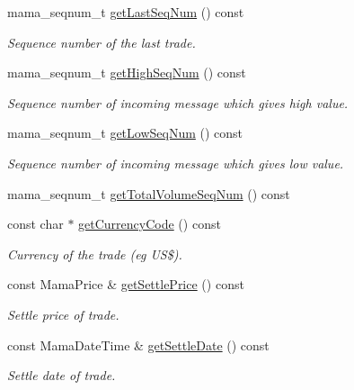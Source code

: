 \begin{CompactItemize}
mama\_\-seqnum\_\-t \hyperlink{classWombat_1_1MamdaTradeListener_bac3ca4094b86f6dd797e68417f04c15}{get\-Last\-Seq\-Num} () const 
\begin{CompactList}\small\item\em Sequence number of the last trade. \item\end{CompactList}\item 
mama\_\-seqnum\_\-t \hyperlink{classWombat_1_1MamdaTradeListener_cfa0551c486d97d5cb04e17f2d2483d4}{get\-High\-Seq\-Num} () const 
\begin{CompactList}\small\item\em Sequence number of incoming message which gives high value. \item\end{CompactList}\item 
mama\_\-seqnum\_\-t \hyperlink{classWombat_1_1MamdaTradeListener_5b4c5e492cb7d005e416e21c7ef819f2}{get\-Low\-Seq\-Num} () const 
\begin{CompactList}\small\item\em Sequence number of incoming message which gives low value. \item\end{CompactList}\item 
mama\_\-seqnum\_\-t \hyperlink{classWombat_1_1MamdaTradeListener_e51bb722030a31e634fb64cba119cbd1}{get\-Total\-Volume\-Seq\-Num} () const 
\item 
const char $\ast$ \hyperlink{classWombat_1_1MamdaTradeListener_cbbf27265245059efc55efa1d6db2c0b}{get\-Currency\-Code} () const 
\begin{CompactList}\small\item\em Currency of the trade (eg US\$). \item\end{CompactList}\item 
const Mama\-Price \& \hyperlink{classWombat_1_1MamdaTradeListener_f3eda46328eb6e9a02e76ff6f936ecc5}{get\-Settle\-Price} () const 
\begin{CompactList}\small\item\em Settle price of trade. \item\end{CompactList}\item 
const Mama\-Date\-Time \& \hyperlink{classWombat_1_1MamdaTradeListener_2f94098f4eefc746ec8447cf31a190a7}{get\-Settle\-Date} () const 
\begin{CompactList}\small\item\em Settle date of trade. \item\end{CompactList}\item 

\end{CompactItemize}
